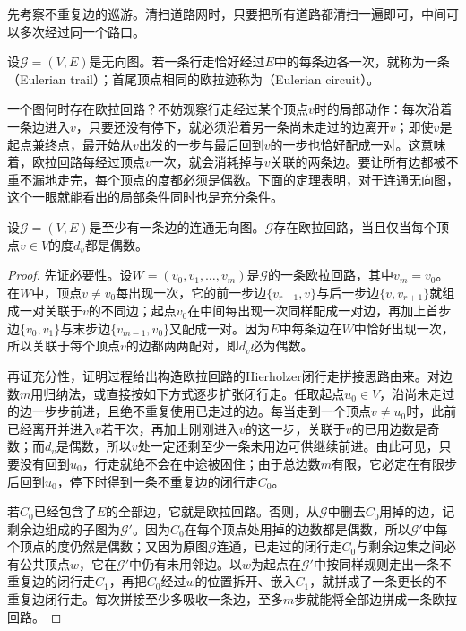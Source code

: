 先考察不重复边的巡游。清扫道路网时，只要把所有道路都清扫一遍即可，中间可以多次经过同一个路口。

\begin{definition}[欧拉迹与欧拉回路]
\label{def:graph-euler-circuit}
设$\mathcal G=(V,E)$是无向图。若一条行走恰好经过$E$中的每条边各一次，就称为一条（Eulerian trail）；首尾顶点相同的欧拉迹称为（Eulerian circuit）。
\end{definition}

一个图何时存在欧拉回路？不妨观察行走经过某个顶点$v$时的局部动作：每次沿着一条边进入$v$，只要还没有停下，就必须沿着另一条尚未走过的边离开$v$；即使$v$是起点兼终点，最开始从$v$出发的一步与最后回到$v$的一步也恰好配成一对。这意味着，欧拉回路每经过顶点$v$一次，就会消耗掉与$v$关联的两条边。要让所有边都被不重不漏地走完，每个顶点的度都必须是偶数。下面的定理表明，对于连通无向图，这个一眼就能看出的局部条件同时也是充分条件。

\begin{theorem}[无向图欧拉回路的判别]
\label{thm:graph-euler-circuit}
设$\mathcal G=(V,E)$是至少有一条边的连通无向图。$\mathcal G$存在欧拉回路，当且仅当每个顶点$v\in V$的度$d_v$都是偶数。
\end{theorem}

\begin{proof}
先证必要性。设$W=(v_0,v_1,\ldots,v_m)$是$\mathcal G$的一条欧拉回路，其中$v_m=v_0$。在$W$中，顶点$v\neq v_0$每出现一次，它的前一步边$\{v_{r-1},v\}$与后一步边$\{v,v_{r+1}\}$就组成一对关联于$v$的不同边；起点$v_0$在中间每出现一次同样配成一对边，再加上首步边$\{v_0,v_1\}$与末步边$\{v_{m-1},v_0\}$又配成一对。因为$E$中每条边在$W$中恰好出现一次，所以关联于每个顶点$v$的边都两两配对，即$d_v$必为偶数。

再证充分性，证明过程给出构造欧拉回路的Hierholzer闭行走拼接思路由来。对边数$m$用归纳法，或直接按如下方式逐步扩张闭行走。任取起点$u_0\in V$，沿尚未走过的边一步步前进，且绝不重复使用已走过的边。每当走到一个顶点$v\neq u_0$时，此前已经离开并进入$v$若干次，再加上刚刚进入$v$的这一步，关联于$v$的已用边数是奇数；而$d_v$是偶数，所以$v$处一定还剩至少一条未用边可供继续前进。由此可见，只要没有回到$u_0$，行走就绝不会在中途被困住；由于总边数$m$有限，它必定在有限步后回到$u_0$，停下时得到一条不重复边的闭行走$C_0$。

若$C_0$已经包含了$E$的全部边，它就是欧拉回路。否则，从$\mathcal G$中删去$C_0$用掉的边，记剩余边组成的子图为$\mathcal G'$。因为$C_0$在每个顶点处用掉的边数都是偶数，所以$\mathcal G'$中每个顶点的度仍然是偶数；又因为原图$\mathcal G$连通，已走过的闭行走$C_0$与剩余边集之间必有公共顶点$w$，它在$\mathcal G'$中仍有未用邻边。以$w$为起点在$\mathcal G'$中按同样规则走出一条不重复边的闭行走$C_1$，再把$C_0$经过$w$的位置拆开、嵌入$C_1$，就拼成了一条更长的不重复边闭行走。每次拼接至少多吸收一条边，至多$m$步就能将全部边拼成一条欧拉回路。
\end{proof}

